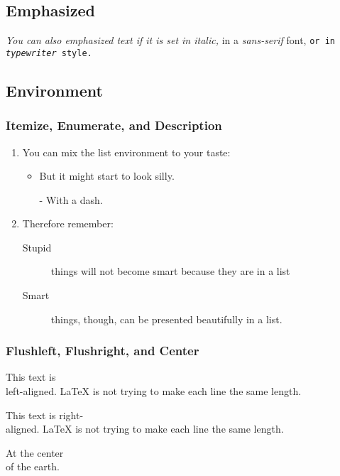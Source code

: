 \documentclass[a4paper,11pt]{article}
\begin{document}
\subsection{Emphasized}
\textit{You can also 
\emph{emphasized} text if 
it is set in italic,}
\textsf{in a 
\emph{sans-serif} font,}
\texttt{or in
\emph{typewriter} style.}

\subsection{Environment}
\subsubsection{Itemize, Enumerate, and Description}
\flushleft
\begin{enumerate}
    \item You can mix the list
environment to your taste:
    \begin{itemize}
        \item But it might start to
    look silly.
        \item[-] With a dash. 
    \end{itemize} 
    \item Therefore remember: 
    \begin{description}
        \item[Stupid] things will not become smart because they are in a list 
        \item[Smart] things, though, can be presented beautifully in a list.
    \end{description}
\end{enumerate}
\subsubsection{Flushleft, Flushright, and Center}
\begin{flushleft}
    This text is\\ left-aligned.
    \LaTeX{} is not trying to make each line
    the same length.
\end{flushleft}

\begin{flushright}
    This text is right-\\aligned.
    \LaTeX{} is not trying to make each
    line the same length.
\end{flushright}

\begin{center}
    At the center\\of the earth.
\end{center}
\end{document}
